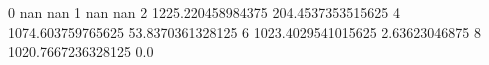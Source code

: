 0 nan nan
1 nan nan
2 1225.220458984375 204.4537353515625
4 1074.603759765625 53.8370361328125
6 1023.4029541015625 2.63623046875
8 1020.7667236328125 0.0
